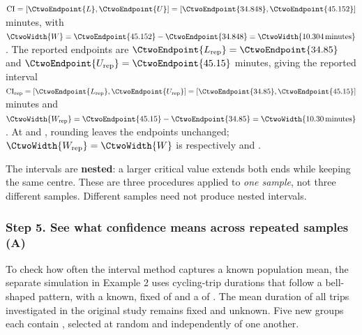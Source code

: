 $\mathrm{CI}=[\CtwoEndpoint{L},\CtwoEndpoint{U}]=[\CtwoEndpoint{34.848},\CtwoEndpoint{45.152}]$ minutes,
with $\CtwoWidth{W}=\CtwoEndpoint{45.152}-\CtwoEndpoint{34.848}=\CtwoWidth{10.304\,\text{minutes}}$.
The reported endpoints are $\CtwoEndpoint{L_{\rm rep}}=\CtwoEndpoint{34.85}$ and
$\CtwoEndpoint{U_{\rm rep}}=\CtwoEndpoint{45.15}$ minutes, giving the reported interval
$\mathrm{CI}_{\rm rep}=[\CtwoEndpoint{L_{\rm rep}},\CtwoEndpoint{U_{\rm rep}}]=[\CtwoEndpoint{34.85},\CtwoEndpoint{45.15}]$ minutes and
$\CtwoWidth{W_{\rm rep}}=\CtwoEndpoint{45.15}-\CtwoEndpoint{34.85}=\CtwoWidth{10.30\,\text{minutes}}$.
At  and , rounding leaves the endpoints unchanged;
$\CtwoWidth{W_{\rm rep}}=\CtwoWidth{W}$ is respectively  and .

The intervals are \textbf{nested}: a larger critical value extends both ends while
keeping the same centre. These are three procedures applied to \emph{one sample},
not three different samples. Different samples need not produce nested intervals.
\par\vspace{3mm}

\clearpage
\subsubsection*{Step 5. See what confidence means across repeated samples (A)}
To check how often the interval method captures a known population mean, the separate simulation in Example 2 uses cycling-trip durations that follow a bell-shaped pattern, with a known, fixed  of  and a  of . The mean duration of all trips investigated in the original study remains fixed and unknown. Five new groups each contain , selected at random and independently of one another.

